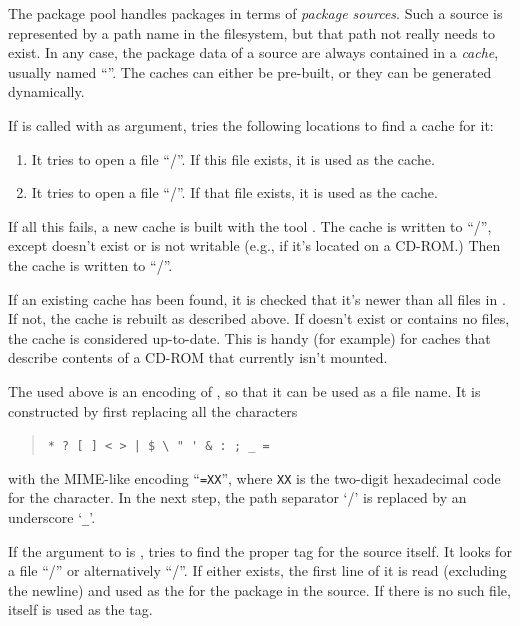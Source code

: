 \documentclass[10pt]{article}
\begin{document}
The package pool handles packages in terms of {\em package sources}.
Such a source is represented by a path name in the filesystem, but
that path not really needs to exist. In any case, the package data of
a source are always contained in a {\em cache}, usually named
``\INFOFILENAME''. The caches can either be pre-built, or they can be
generated dynamically.

If  is called with  as argument,
 tries the following locations to find a cache for it:
\begin{enumerate}
\item
  It tries to open a file ``\slash\INFOFILENAME''. If
  this file exists, it is used as the cache.

\item
  It tries to open a file 
  ``\PKGDBVLIBPATH\slash\RCACHEPREFIX{}''. If that
  file exists, it is used as the cache.
\end{enumerate}
If all this fails, a new cache is built with the tool \MKSUMPROG. The
cache is written to ``\slash\INFOFILENAME'', except
 doesn't exist or is not writable (e.g., if it's located on
a CD-ROM.) Then the cache is written to
``\PKGDBVLIBPATH\slash\RCACHEPREFIX{}''.

If an existing cache has been found, it is checked that it's newer
than all  files in . If not, the cache is
rebuilt as described above. If  doesn't exist or contains no
 files, the cache is considered up-to-date. This is
handy (for example) for caches that describe contents of a CD-ROM that
currently isn't mounted.

The  used above is an encoding of , so
that it can be used as a file name. It is constructed by first
replacing all the characters
\begin{quote}
\verb^* ? [ ] < > | $ \ " ' & : ; _ =^
\end{quote}
with the MIME-like encoding ``\verb-=XX-'', where \verb-XX- is the
two-digit hexadecimal code for the character. In the next step, the
path separator `\slash' is replaced by an underscore `\texttt{_}'.

If the  argument to  is ,
 tries to find the proper tag for the source itself.
It looks for a file ``\slash\RELEASEFILENAME'' or
alternatively
``\PKGDBVLIBPATH\slash\RRELEASEPREFIX{}''. If
either exists, the first line of it is read (excluding the newline)
and used as the  for the package in the source. If
there is no such file,  itself is used as the tag.
\end{document}
